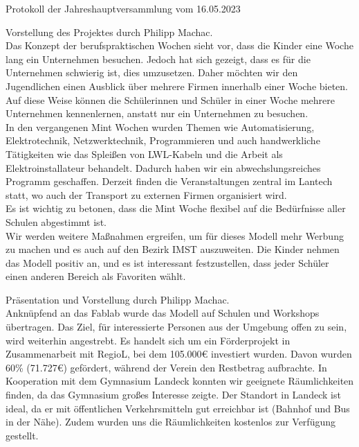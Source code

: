 \documentclass{scrartcl}
\newcommand\obmann{Philipp Machac}
\begin{document}
\begin{Minutes}{Protokoll der Jahreshauptversammlung vom 16.05.2023}


  Vorstellung des Projektes durch \obmann.\\

  Das Konzept der berufspraktischen Wochen sieht vor, dass die Kinder eine Woche lang ein Unternehmen besuchen. 
  Jedoch hat sich gezeigt, dass es für die Unternehmen schwierig ist, dies umzusetzen. 
  Daher möchten wir den Jugendlichen einen Ausblick über mehrere Firmen innerhalb einer Woche bieten. 
  Auf diese Weise können die Schülerinnen und Schüler in einer Woche mehrere Unternehmen kennenlernen, anstatt nur ein Unternehmen zu besuchen. \\
  In den vergangenen Mint Wochen wurden Themen wie Automatisierung, Elektrotechnik, Netzwerktechnik, Programmieren und auch handwerkliche 
  Tätigkeiten wie das Spleißen von LWL-Kabeln und die Arbeit als Elektroinstallateur behandelt. 
  Dadurch haben wir ein abwechslungsreiches Programm geschaffen. 
  Derzeit finden die Veranstaltungen zentral im Lantech statt, wo auch der Transport zu externen Firmen organisiert wird. \\
  Es ist wichtig zu betonen, dass die Mint Woche flexibel auf die Bedürfnisse aller Schulen abgestimmt ist. \\
  Wir werden weitere Maßnahmen ergreifen, um für dieses Modell mehr Werbung zu machen und es auch auf den Bezirk IMST auszuweiten. 
  Die Kinder nehmen das Modell positiv an, und es ist interessant festzustellen, dass jeder Schüler einen anderen Bereich als Favoriten wählt.
  
  Präsentation und Vorstellung durch \obmann.\\

  Anknüpfend an das Fablab wurde das Modell auf Schulen und Workshops übertragen. Das Ziel, für interessierte Personen aus der Umgebung offen zu sein, wird weiterhin angestrebt. Es handelt sich um ein Förderprojekt in Zusammenarbeit mit RegioL, bei dem 105.000€ investiert wurden. Davon wurden 60\% (71.727€) gefördert, während der Verein den Restbetrag aufbrachte. In Kooperation mit dem Gymnasium Landeck konnten wir geeignete Räumlichkeiten finden, da das Gymnasium großes Interesse zeigte. Der Standort in Landeck ist ideal, da er mit öffentlichen Verkehrsmitteln gut erreichbar ist (Bahnhof und Bus in der Nähe). Zudem wurden uns die Räumlichkeiten kostenlos zur Verfügung gestellt.


\end{Minutes}
\end{document}
